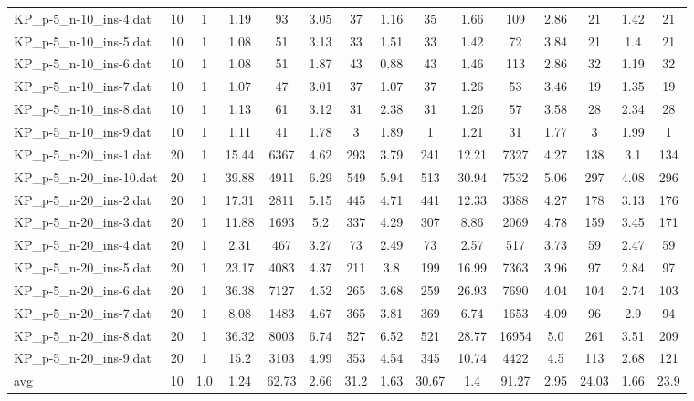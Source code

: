 \begin{table}[!ht]
{\begin{tabular}{lcccccccccccccc}
KP\_p-5\_n-10\_ins-4.dat & 10 & 1 & 1.19 & 93 & 3.05 & 37 & 1.16 & 35 & 1.66 & 109 & 2.86 & 21 & 1.42 & 21 \\
KP\_p-5\_n-10\_ins-5.dat & 10 & 1 & 1.08 & 51 & 3.13 & 33 & 1.51 & 33 & 1.42 & 72 & 3.84 & 21 & 1.4 & 21 \\
KP\_p-5\_n-10\_ins-6.dat & 10 & 1 & 1.08 & 51 & 1.87 & 43 & 0.88 & 43 & 1.46 & 113 & 2.86 & 32 & 1.19 & 32 \\
KP\_p-5\_n-10\_ins-7.dat & 10 & 1 & 1.07 & 47 & 3.01 & 37 & 1.07 & 37 & 1.26 & 53 & 3.46 & 19 & 1.35 & 19 \\
KP\_p-5\_n-10\_ins-8.dat & 10 & 1 & 1.13 & 61 & 3.12 & 31 & 2.38 & 31 & 1.26 & 57 & 3.58 & 28 & 2.34 & 28 \\
KP\_p-5\_n-10\_ins-9.dat & 10 & 1 & 1.11 & 41 & 1.78 & 3 & 1.89 & 1 & 1.21 & 31 & 1.77 & 3 & 1.99 & 1 \\
KP\_p-5\_n-20\_ins-1.dat & 20 & 1 & 15.44 & 6367 & 4.62 & 293 & 3.79 & 241 & 12.21 & 7327 & 4.27 & 138 & 3.1 & 134 \\
KP\_p-5\_n-20\_ins-10.dat & 20 & 1 & 39.88 & 4911 & 6.29 & 549 & 5.94 & 513 & 30.94 & 7532 & 5.06 & 297 & 4.08 & 296 \\
KP\_p-5\_n-20\_ins-2.dat & 20 & 1 & 17.31 & 2811 & 5.15 & 445 & 4.71 & 441 & 12.33 & 3388 & 4.27 & 178 & 3.13 & 176 \\
KP\_p-5\_n-20\_ins-3.dat & 20 & 1 & 11.88 & 1693 & 5.2 & 337 & 4.29 & 307 & 8.86 & 2069 & 4.78 & 159 & 3.45 & 171 \\
KP\_p-5\_n-20\_ins-4.dat & 20 & 1 & 2.31 & 467 & 3.27 & 73 & 2.49 & 73 & 2.57 & 517 & 3.73 & 59 & 2.47 & 59 \\
KP\_p-5\_n-20\_ins-5.dat & 20 & 1 & 23.17 & 4083 & 4.37 & 211 & 3.8 & 199 & 16.99 & 7363 & 3.96 & 97 & 2.84 & 97 \\
KP\_p-5\_n-20\_ins-6.dat & 20 & 1 & 36.38 & 7127 & 4.52 & 265 & 3.68 & 259 & 26.93 & 7690 & 4.04 & 104 & 2.74 & 103 \\
KP\_p-5\_n-20\_ins-7.dat & 20 & 1 & 8.08 & 1483 & 4.67 & 365 & 3.81 & 369 & 6.74 & 1653 & 4.09 & 96 & 2.9 & 94 \\
KP\_p-5\_n-20\_ins-8.dat & 20 & 1 & 36.32 & 8003 & 6.74 & 527 & 6.52 & 521 & 28.77 & 16954 & 5.0 & 261 & 3.51 & 209 \\
KP\_p-5\_n-20\_ins-9.dat & 20 & 1 & 15.2 & 3103 & 4.99 & 353 & 4.54 & 345 & 10.74 & 4422 & 4.5 & 113 & 2.68 & 121 \\
\hline avg & 10 & 1.0 &  1.24 & 62.73 &  2.66 & 31.2 &  1.63 & 30.67 &  1.4 & 91.27 &  2.95 & 24.03 &  1.66 & 23.9 \\ \hline

\end{tabular}}
\end{table}

